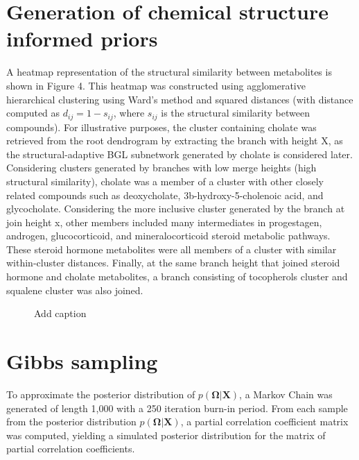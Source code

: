 \section{Generation of chemical structure informed priors}
A heatmap representation of the structural similarity between metabolites is shown in Figure 4. This heatmap was constructed using agglomerative hierarchical clustering using Ward’s method and squared distances (with distance computed as $d_{ij}=1-s_{ij}$, where $s_{ij}$ is the structural similarity between compounds). For illustrative purposes, the cluster containing cholate was retrieved from the root dendrogram by extracting the branch with height X, as the structural-adaptive BGL subnetwork generated by cholate is considered later. Considering clusters generated by branches with low merge heights (high structural similarity), cholate was a member of a cluster with other closely related compounds such as deoxycholate, 3b-hydroxy-5-cholenoic acid, and glycocholate. Considering the more inclusive cluster generated by the branch at join height x, other members included many intermediates in progestagen, androgen, glucocorticoid, and mineralocorticoid steroid metabolic pathways. These steroid hormone metabolites were all members of a cluster with similar within-cluster distances. Finally, at the same branch height that joined steroid hormone and cholate metabolites, a branch consisting of tocopherols cluster and squalene cluster was also joined.

\begin{figure}[ht]
	\caption[Add caption]{Add caption \label{fig:heatmap} }
\end{figure}

\section{Gibbs sampling}
To approximate the posterior distribution of $p(\boldsymbol{\Omega}|\textbf{X})$, a Markov Chain was generated of length 1,000 with a 250 iteration burn-in period. From each sample from the posterior distribution $p(\boldsymbol{\Omega}|\textbf{X})$, a partial correlation coefficient matrix was computed, yielding a simulated posterior distribution for the matrix of partial correlation coefficients.
